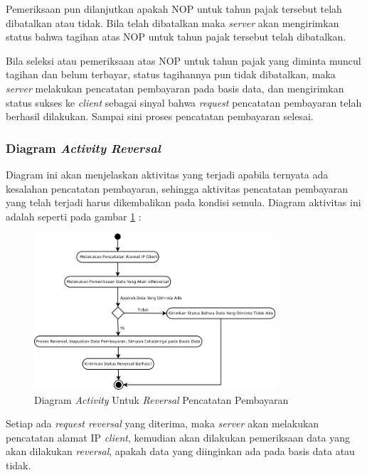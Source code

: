 \documentclass[pdftex,12pt, oneside]{article}
\begin{document}
Pemeriksaan pun dilanjutkan apakah NOP untuk tahun pajak tersebut telah dibatalkan atau tidak. Bila telah dibatalkan maka \textit{server} akan mengirimkan status bahwa tagihan atas NOP untuk tahun pajak tersebut telah dibatalkan.

Bila seleksi atau pemeriksaan atas NOP untuk tahun pajak yang diminta muncul tagihan dan belum terbayar, status tagihannya pun tidak dibatalkan, maka \textit{server} melakukan pencatatan pembayaran pada basis data, dan mengirimkan status sukses ke \textit{client} sebagai sinyal bahwa \textit{request} pencatatan pembayaran telah berhasil dilakukan. Sampai sini proses pencatatan pembayaran selesai.

\subsubsection{Diagram \textit{Activity Reversal}}

Diagram ini akan menjelaskan aktivitas yang terjadi apabila ternyata ada kesalahan pencatatan pembayaran, sehingga aktivitas pencatatan pembayaran yang telah terjadi harus dikembalikan pada kondisi semula. Diagram aktivitas ini adalah seperti pada gambar \ref{fig:uml-act-reversal} : 

\begin{figure}[H]
  \centering
  \includegraphics[width=0.8\textwidth]{./resources/diagram/uml-act-reversal}
  \caption{Diagram \textit{Activity} Untuk \textit{Reversal} Pencatatan Pembayaran}
  \label{fig:uml-act-reversal}
\end{figure}

Setiap ada \textit{request reversal} yang diterima, maka \textit{server} akan melakukan pencatatan alamat IP \textit{client}, kemudian akan dilakukan pemeriksaan data yang akan dilakukan \textit{reversal}, apakah data yang diinginkan ada pada basis data atau tidak.
\end{document}
